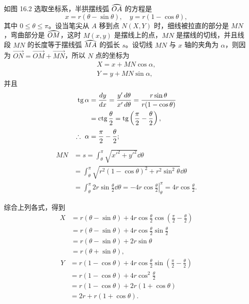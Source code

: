 如图 16.2 选取坐标系，半拱摆线弧 $\arc{OA}$ 的方程是
\[
  x = r(\theta - \sin\theta),\quad y = r(1 - \cos\theta),
\]
其中 $0 \leqslant \theta \leqslant \pi$。设当笔尖从 $A$ 移到点 $N(X, Y)$ 时，细线被拉直的部分是 $MN$，弯曲部分是 $\arc{OM}$，这时 $M(x, y)$ 是摆线上的点，$MN$ 是摆线的切线，并且线段 $MN$ 的长度等于摆线弧 $\arc{MA}$ 的弧长 $s$。设切线 $MN$ 与 $x$ 轴的夹角为 $\alpha$，则因为 $\overrightarrow{ON} = \overrightarrow{OM} + \overrightarrow{MN}$，所以 $N$ 点的坐标为
\begin{gather*}
  X = x + MN\cos\alpha, \\
  Y = y + MN\sin\alpha,
\end{gather*}
并且
\begin{align*}
  \operatorname{tg}\alpha &= \frac{dy}{dx} = \frac{y'\,d\theta}{x'\,d\theta} = \frac{r\sin\theta}{r(1 - \cos\theta)} \\
            &= \operatorname{ctg}\frac{\theta}{2} = \operatorname{tg}\left(\frac{\pi}{2} - \frac{\theta}{2}\right), \\
  \therefore\ \alpha &= \frac{\pi}{2} - \frac{\theta}{2};
\end{align*}
\begin{align*}
  MN &= s = \int_{\theta}^{\pi} \sqrt{x'^2 + y'^2}\dd\theta \\
     &= \int_{\theta}^{\pi} \sqrt{r^2(1 - \cos\theta)^2 + r^2\sin^2\theta}\dd\theta \\
     &= \int_{\theta}^{\pi} 2r\sin\frac{\theta}{2}\dd\theta
      = \left.-4r\cos\frac{\theta}{2}\right|_{\theta}^{\pi} = 4r\cos\frac{\theta}{2}.
\end{align*}

综合上列各式，得到
\begin{align*}
  X &= r(\theta - \sin\theta) + 4r\cos\frac{\theta}{2}\cos\left(\frac{\pi}{2} - \frac{\theta}{2}\right) \\
    &= r(\theta - \sin\theta) + 4r\cos\frac{\theta}{2}\sin\frac{\theta}{2} \\
    &= r(\theta - \sin\theta) + 2r\sin\theta \\
    &= r(\theta + \sin\theta),
\end{align*}
\begin{align*}
  Y &= r(1 - \cos\theta) + 4r\cos\frac{\theta}{2}\sin\left(\frac{\pi}{2} - \frac{\theta}{2}\right) \\
    &= r(1 - \cos\theta) + 4r\cos^2\frac{\theta}{2} \\
    &= r(1 - \cos\theta) + 2r(1 + \cos\theta) \\
    &= 2r + r(1 + \cos\theta).
\end{align*}

